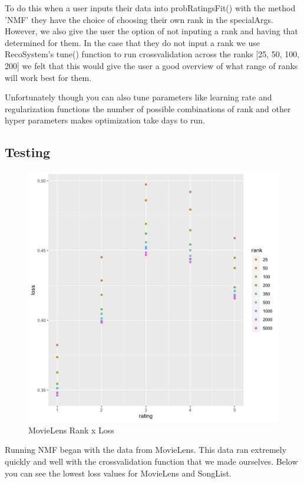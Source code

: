 \documentclass{article}
\begin{document}
To do this when a user inputs their data into probRatingsFit() with the method 'NMF' they have the choice of choosing their own rank in the specialArgs. However, we also give the user the option of not inputing a rank and having that determined for them. In the case that they do not input a rank we use RecoSystem's tune() function to run crossvalidation across the ranks [25, 50, 100, 200] we felt that this would give the user a good overview of what range of ranks will work best for them. 

Unfortunately though you can also tune parameters like learning rate and regularization functions the number of possible combinations of rank and other hyper parameters makes optimization take days to run.

\subsection{Testing}

\begin{figure}[ht]
\centering
\includegraphics[scale=0.3]{FinalNMFMovie.png}
\caption{MovieLens Rank x Loss}
\label{fig:universe}
\end{figure}

Running NMF began with the data from MovieLens. This data ran extremely quickly and well with the crossvalidation function that we made ourselves. Below you can see the lowest loss values for MovieLens and SongList.
\end{document}
